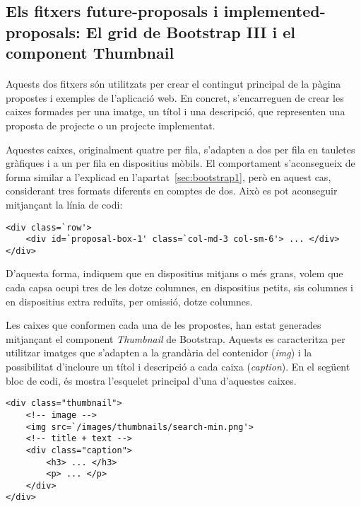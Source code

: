 \subsection{Els fitxers future-proposals i implemented-proposals: El grid de Bootstrap III i el component Thumbnail}

    \paragraph{}
    Aquests dos fitxers són utilitzats per crear el contingut principal de la pàgina propostes i exemples de l'aplicació web. En concret, s'encarreguen de crear les caixes formades per una imatge, un títol i una descripció, que representen una proposta de projecte o un projecte implementat.

    Aquestes caixes, originalment quatre per fila, s'adapten a dos per fila en tauletes gràfiques i a un per fila en dispositius mòbils. El comportament s'aconsegueix de forma similar a l'explicad en l'apartat~\ref{sec:bootstrap1}, però en aquest cas, considerant tres formats diferents en comptes de dos. Això es pot aconseguir mitjançant la línia de codi:

    \begin{lstlisting}[style=rawOwn,caption={Multiples configuracions en un bloc de columnes}]
<div class=`row'>
    <div id=`proposal-box-1' class=`col-md-3 col-sm-6'> ... </div>
</div>
    \end{lstlisting}

    D'aquesta forma, indiquem que en dispositius mitjans o més grans, volem que cada capsa ocupi tres de les dotze columnes, en dispositius petits, sis columnes i en dispositius extra reduïts, per omissió, dotze columnes.

    Les caixes que conformen cada una de les propostes, han estat generades mitjançant el component \emph{Thumbnail} de Bootstrap. Aquests es caracteritza per utilitzar imatges que s'adapten a la grandària del contenidor (\emph{img}) i la possibilitat d'incloure un títol i descripció a cada caixa (\emph{caption}). En el següent bloc de codi, és mostra l'esquelet principal d'una d'aquestes caixes.

    \begin{lstlisting}[style=rawOwn,caption={Exemple de Bootstrap Thumbnail}]
<div class="thumbnail">
    <!-- image -->
    <img src=`/images/thumbnails/search-min.png'>
    <!-- title + text -->
    <div class="caption">
        <h3> ... </h3>
        <p> ... </p>
    </div>
</div>
    \end{lstlisting}
